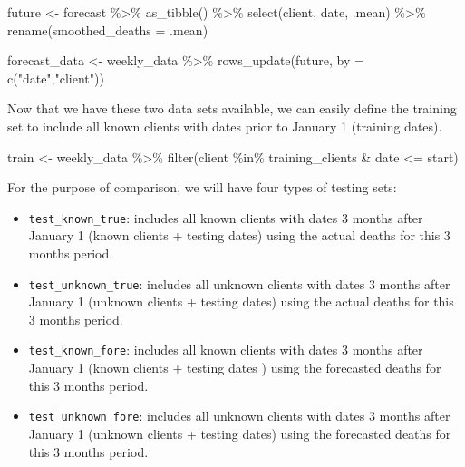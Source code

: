 \documentclass[
]{article}
\newenvironment{Shaded}{\begin{snugshade}}{\end{snugshade}}
\newcommand{\AttributeTok}[1]{\textcolor[rgb]{0.77,0.63,0.00}{#1}}
\newcommand{\FunctionTok}[1]{\textcolor[rgb]{0.00,0.00,0.00}{#1}}
\newcommand{\NormalTok}[1]{#1}
\newcommand{\OtherTok}[1]{\textcolor[rgb]{0.56,0.35,0.01}{#1}}
\newcommand{\SpecialCharTok}[1]{\textcolor[rgb]{0.00,0.00,0.00}{#1}}
\newcommand{\StringTok}[1]{\textcolor[rgb]{0.31,0.60,0.02}{#1}}
\providecommand{\tightlist}{%
  \setlength{\itemsep}{0pt}\setlength{\parskip}{0pt}}
\begin{document}
\begin{Shaded}
\begin{Highlighting}[]
\NormalTok{future }\OtherTok{\textless{}{-}}
\NormalTok{  forecast }\SpecialCharTok{\%\textgreater{}\%}
  \FunctionTok{as\_tibble}\NormalTok{() }\SpecialCharTok{\%\textgreater{}\%}
  \FunctionTok{select}\NormalTok{(client, date, .mean) }\SpecialCharTok{\%\textgreater{}\%}
  \FunctionTok{rename}\NormalTok{(}\AttributeTok{smoothed\_deaths =}\NormalTok{ .mean)}

\NormalTok{forecast\_data }\OtherTok{\textless{}{-}}
\NormalTok{  weekly\_data }\SpecialCharTok{\%\textgreater{}\%}
  \FunctionTok{rows\_update}\NormalTok{(future, }\AttributeTok{by =} \FunctionTok{c}\NormalTok{(}\StringTok{"date"}\NormalTok{,}\StringTok{"client"}\NormalTok{))}
\end{Highlighting}
\end{Shaded}

Now that we have these two data sets available, we can easily define the
training set to include all known clients with dates prior to January 1
(training dates).

\begin{Shaded}
\begin{Highlighting}[]
\NormalTok{train }\OtherTok{\textless{}{-}}
\NormalTok{  weekly\_data }\SpecialCharTok{\%\textgreater{}\%}
  \FunctionTok{filter}\NormalTok{(client }\SpecialCharTok{\%in\%}\NormalTok{ training\_clients }\SpecialCharTok{\&}\NormalTok{ date }\SpecialCharTok{\textless{}=}\NormalTok{ start)}
\end{Highlighting}
\end{Shaded}

For the purpose of comparison, we will have four types of testing sets:

\begin{itemize}
\tightlist
\item
  \texttt{test\_known\_true}: includes all known clients with dates 3
  months after January 1 (known clients + testing dates) using the
  actual deaths for this 3 months period.
\item
  \texttt{test\_unknown\_true}: includes all unknown clients with dates
  3 months after January 1 (unknown clients + testing dates) using the
  actual deaths for this 3 months period.
\item
  \texttt{test\_known\_fore}: includes all known clients with dates 3
  months after January 1 (known clients + testing dates ) using the
  forecasted deaths for this 3 months period.
\item
  \texttt{test\_unknown\_fore}: includes all unknown clients with dates
  3 months after January 1 (unknown clients + testing dates) using the
  forecasted deaths for this 3 months period.
\end{itemize}
\end{document}
